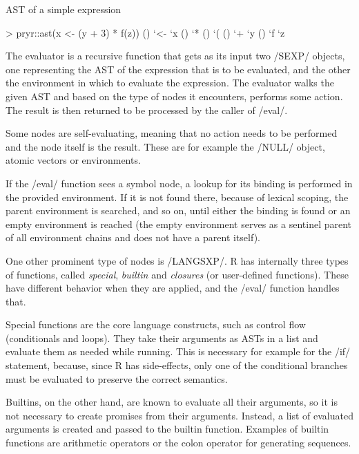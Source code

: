 {\begin{listing}[htbp]
  \caption{\label{lst:ast}AST of a simple expression}
  \begin{rcode}
> pryr::ast(x <- (y + 3) * f(z))
\- ()
  \- `<-
  \- `x
  \- ()
    \- `*
    \- ()
      \- `(
      \- ()
        \- `+
        \- `y
    \- ()
      \- `f
      \- `z
  \end{rcode}
\end{listing}

The evaluator is a recursive function that gets as its input two \cinline/SEXP/ objects, one representing the AST of the expression that is to be evaluated, and the other the environment in which to evaluate the expression. The evaluator walks the given AST and based on the type of nodes it encounters, performs some action. The result is then returned to be processed by the caller of \cinline/eval/.

Some nodes are self-evaluating, meaning that no action needs to be performed and the node itself is the result. These are for example the \rinline/NULL/ object, atomic vectors or environments.

If the \cinline/eval/ function sees a symbol node, a lookup for its binding is performed in the provided environment. If it is not found there, because of lexical scoping, the parent environment is searched, and so on, until either the binding is found or an empty environment is reached (the empty environment serves as a sentinel parent of all environment chains and does not have a parent itself).

One other prominent type of nodes is \cinline/LANGSXP/. R has internally three types of functions, called \emph{special}, \emph{builtin} and \emph{closures} (or user-defined functions). These have different behavior when they are applied, and the \cinline/eval/ function handles that.

Special functions are the core language constructs, such as control flow (conditionals and loops). They take their arguments as ASTs in a list and evaluate them as needed while running. This is necessary for example for the \rinline/if/ statement, because, since R has side-effects, only one of the conditional branches must be evaluated to preserve the correct semantics.

Builtins, on the other hand, are known to evaluate all their arguments, so it is not necessary to create promises from their arguments. Instead, a list of evaluated arguments is created and passed to the builtin function. Examples of builtin functions are arithmetic operators or the colon operator for generating sequences.

}
